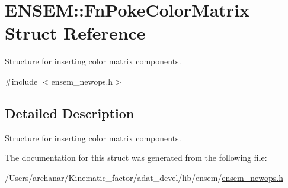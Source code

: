\hypertarget{structENSEM_1_1FnPokeColorMatrix}{}\section{E\+N\+S\+EM\+:\+:Fn\+Poke\+Color\+Matrix Struct Reference}
\label{structENSEM_1_1FnPokeColorMatrix}


Structure for inserting color matrix components.  




{\ttfamily \#include $<$ensem\+\_\+newops.\+h$>$}



\subsection{Detailed Description}
Structure for inserting color matrix components. 

The documentation for this struct was generated from the following file\+:\begin{DoxyCompactItemize}
\item 
/\+Users/archanar/\+Kinematic\+\_\+factor/adat\+\_\+devel/lib/ensem/\mbox{\hyperlink{lib_2ensem_2ensem__newops_8h}{ensem\+\_\+newops.\+h}}\end{DoxyCompactItemize}
